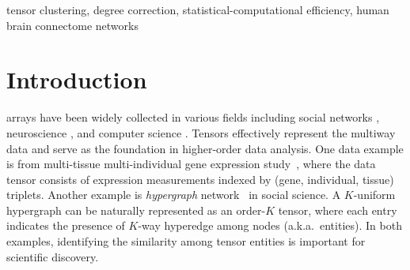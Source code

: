\documentclass[journal]{IEEEtran}
\theoremstyle{definition}
\theoremstyle{definition}
\begin{document}
\begin{IEEEkeywords}
tensor clustering, degree correction, statistical-computational efficiency, human brain connectome networks
\end{IEEEkeywords}






%
\IEEEpeerreviewmaketitle



\section{Introduction}
% 
% 
% 
% 

 arrays have been widely collected in various fields including social networks \citep{anandkumar2014tensor}, neuroscience \citep{wang2017bayesian}, and computer science \citep{koniusz2016sparse}. Tensors effectively represent the multiway data and serve as the foundation in higher-order data analysis. One data example is from multi-tissue multi-individual gene expression study~\citep{wang2019three,hore2016tensor}, where the data tensor consists of expression measurements indexed by (gene, individual, tissue) triplets. Another example is \emph{hypergraph} network~\citep{ghoshdastidar2017uniform,ghoshdastidar2017consistency,ahn2019community,ke2019community} in social science. A $K$-uniform hypergraph can be naturally represented as an order-$K$ tensor, where each entry indicates the presence of $K$-way hyperedge among nodes (a.k.a.\ entities). In both examples, identifying the similarity among tensor entities is important for scientific discovery. 
\end{document}
